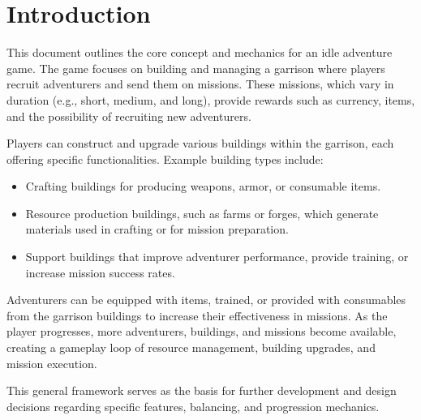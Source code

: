 \chapter{Introduction}

This document outlines the core concept and mechanics for an idle adventure game. The game focuses on building and managing a garrison where players recruit adventurers and send them on missions. These missions, which vary in duration (e.g., short, medium, and long), provide rewards such as currency, items, and the possibility of recruiting new adventurers.

Players can construct and upgrade various buildings within the garrison, each offering specific functionalities. Example building types include:
\begin{itemize}
    \item Crafting buildings for producing weapons, armor, or consumable items.
    \item Resource production buildings, such as farms or forges, which generate materials used in crafting or for mission preparation.
    \item Support buildings that improve adventurer performance, provide training, or increase mission success rates.
\end{itemize}

Adventurers can be equipped with items, trained, or provided with consumables from the garrison buildings to increase their effectiveness in missions. As the player progresses, more adventurers, buildings, and missions become available, creating a gameplay loop of resource management, building upgrades, and mission execution.

This general framework serves as the basis for further development and design decisions regarding specific features, balancing, and progression mechanics.
